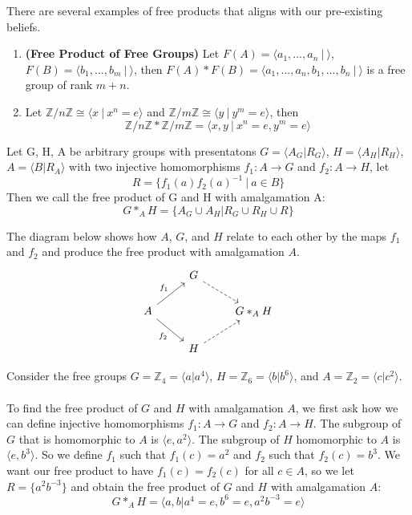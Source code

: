 \begin{example}
There are several examples of free products that aligns with our pre-existing beliefs.
\begin{enumerate}
    \item {\bf (Free Product of Free Groups)} Let $F(A) = \langle a_1, ..., a_n\ |\ \rangle$, $F(B) = \langle b_1, ..., b_m\ |\ \rangle$, then $F(A)*F(B) = \langle a_1, ..., a_n, b_1, ..., b_n\ |\ \rangle$ is a free group of rank $m+n$.
    \item Let $\mathbb{Z}/n\mathbb{Z} \cong \langle x\ |\ x^n = e\rangle$ and $\mathbb{Z}/m\mathbb{Z} \cong \langle y\ |\ y^m = e\rangle$, then 
    \[\mathbb{Z}/n\mathbb{Z}*\mathbb{Z}/m\mathbb{Z} = \langle x, y\ |\ x^n = e, y^m = e\rangle\]
\end{enumerate}
\end{example}

\begin{definition} Let G, H, A be arbitrary groups with presentatons $G = \langle A_G | R_G \rangle$, $H = \langle A_H | R_H \rangle$, $A = \langle B | R_A \rangle$ with two injective homomorphisms $f_1: A \to G$ and $f_2: A \to H$, let
\[R = \{f_1(a)f_2(a)^{-1}\ |\ a \in B\}\]
Then we call the free product of G and H with amalgamation A:
\[G *_A H = \{A_G \cup A_H | R_G \cup R_H \cup R\}\]

\noindent The diagram below shows how $A$, $G$, and $H$ relate to each other by the maps $f_1$ and $f_2$ and produce the free product with amalgamation $A$.
\[\begin{tikzcd}
	& G \\
	A && {G *_A H} \\
	& H
	\arrow["{f_1}", from=2-1, to=1-2]
	\arrow["{f_2}"', from=2-1, to=3-2]
	\arrow[dashed, from=3-2, to=2-3]
	\arrow[dashed, from=1-2, to=2-3]
\end{tikzcd}\]

\end{definition}

\begin{example}
Consider the free groups $G = \mathbb{Z}_{4} = \langle a | a^4\rangle$, $H = \mathbb{Z}_{6} = \langle b | b^6 \rangle$, and $A = \mathbb{Z}_{2} = \langle c | c^2 \rangle$.\\\\
To find the free product of $G$ and $H$ with amalgamation $A$, we first ask how we can define injective homomorphisms $f_1: A \to G$ and $f_2: A \to H$. The subgroup of $G$ that is homomorphic to $A$ is $\langle e, a^2\rangle$. The subgroup of $H$ homomorphic to $A$ is $\langle e, b^3 \rangle$. So we define $f_1$ such that $f_1(c) = a^2$ and $f_2$ such that $f_2(c) = b^3$. We want our free product to have $f_1(c) = f_2(c)$ for all $c \in A$, so we let $ R = \{a^2b^{-3}\}$ and obtain the free product of $G$ and $H$ with amalgamation $A$: \[G *_A H = \langle a,b | a^4 = e,b^6=e,a^2b^{-3}=e \rangle\]
\end{example}